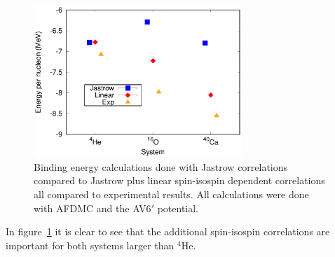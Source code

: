 \begin{figure}[h!]
   \centering
   \includegraphics[width=0.7\textwidth]{figures/energy_jaslin.eps}
   \caption{Binding energy calculations done with Jastrow correlations \cite{gandolfi2007} compared to Jastrow plus linear spin-isospin dependent correlations \cite{gandolfi2014} all compared to experimental results. All calculations were done with AFDMC and the AV6$'$ potential.}
   \label{fig:energy_jaslin}
\end{figure}
In figure~\ref{fig:energy_jaslin} it is clear to see that the additional spin-isospin correlations are important for both systems larger than $^4$He.

